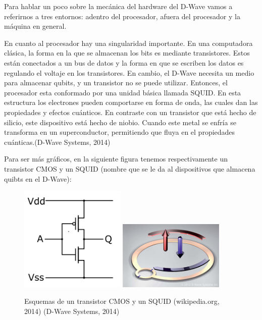 \documentclass[11pt,a4paper]{article}
\begin{document}
Para hablar un poco sobre la mecánica del hardware del D-Wave vamos a referirnos a tres entornos: adentro del procesador, afuera del procesador y la máquina en general.

En cuanto al procesador hay una singularidad importante. En una computadora clásica, la forma en la que se almacenan los bits es mediante transistores. Estos están conectados a un bus de datos y la forma en que se escriben los datos es regulando el voltaje en los transistores. En cambio, el D-Wave necesita un medio para almacenar qubits, y un transistor no se puede utilizar. Entonces, el procesador esta conformado por una unidad básica llamada SQUID. En esta estructura los electrones pueden comportarse en forma de onda, las cuales dan las propiedades y efectos cuánticos. En contraste con un transistor que está hecho de silicio, este dispositivo está hecho de niobio. Cuando este metal se enfría se transforma en un superconductor, permitiendo que fluya en el propiedades cuánticas.(D-Wave Systems, 2014)

Para ser más gráficos, en la siguiente figura tenemos respectivamente un transistor CMOS y un SQUID (nombre que se le da al dispositivos que almacena quibts en el D-Wave):

\begin{figure}[h]
\centering
\includegraphics[width=0.45\textwidth]{cmos}
\includegraphics[width=0.45\textwidth]{squid}
\caption{Esquemas de un transistor CMOS y un SQUID (wikipedia.org, 2014) (D-Wave Systems, 2014)}
\end{figure}
\end{document}
